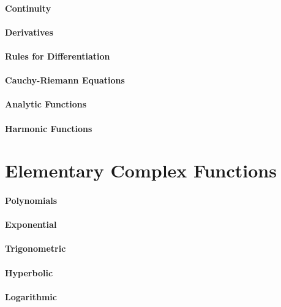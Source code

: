 \paragraph{Continuity}

\paragraph{Derivatives}

\paragraph{Rules for Differentiation}

\paragraph{Cauchy-Riemann Equations}

\paragraph{Analytic Functions}

\paragraph{Harmonic Functions}


\section{Elementary Complex Functions}

\paragraph{Polynomials}

\paragraph{Exponential}

\paragraph{Trigonometric}

\paragraph{Hyperbolic}

\paragraph{Logarithmic}
